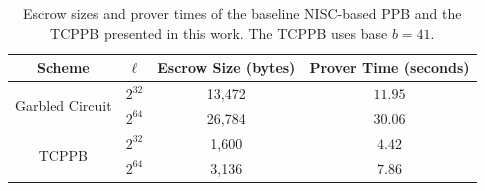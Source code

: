 \begin{table}[th]
	\label{tab:experiments}
	\centering
	\begin{tabular}{|c|c|c|c|}
		\hline
		\textbf{Scheme}                  & $\ell$   & \textbf{Escrow Size (bytes)} & \textbf{Prover Time (seconds)} \\
		\hline
		\multirow{2}{*}{Garbled Circuit} & $2^{32}$ & 13,472                       & $11.95$                        \\
		                                 & $2^{64}$ & 26,784                       & $30.06$                        \\
		\hline
		\multirow{2}{*}{TCPPB}           & $2^{32}$ & 1,600                        & $4.42$                         \\
		                                 & $2^{64}$ & 3,136                        & $7.86$                         \\
		\hline
	\end{tabular}
	\caption[Escrow Sizes and Prover Times of \schemename{} and the baseline NISC-based PPB]{Escrow sizes and prover times of the baseline NISC-based PPB and the TCPPB presented in this work. The TCPPB uses base $b = 41$.}

\end{table}

